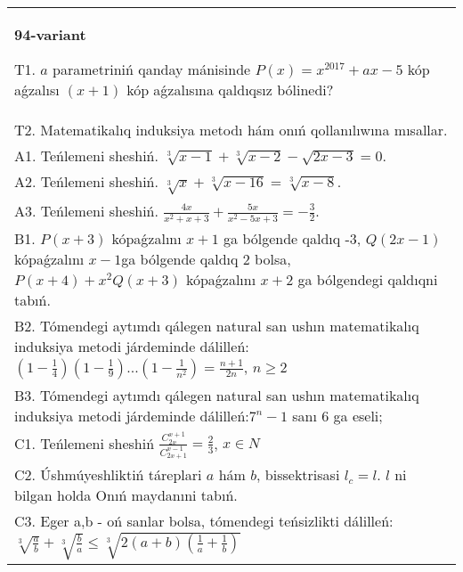 \documentclass{article}
\begin{document}
\begin{tabular}{m{17cm}}
\textbf{94-variant}
\newline

T1. \(a\) parametriniń qanday mánisinde \(P(x) = x^{2017} + ax - 5\) kóp aǵzalısı \((x + 1)\) kóp aǵzalısına qaldıqsız bólinedi? \\
T2. Matematikalıq induksiya metodı hám onıń qollanılıwına mısallar. \\
A1. Teńlemeni sheshiń. \(\sqrt[3]{x - 1} + \sqrt[3]{x - 2} - \sqrt{2x - 3} = 0\). \\
A2. Teńlemeni sheshiń. \(\sqrt[3]{x} + \sqrt[3]{x - 16} = \sqrt[3]{x - 8}\). \\
A3. Teńlemeni sheshiń. \(\frac{4x}{x^{2} + x + 3} + \frac{5x}{x^{2} - 5x + 3} = - \frac{3}{2}\). \\
B1. \(P(x + 3)\) kópaǵzalını \(x + 1\) ga bólgende qaldıq -3, \(Q(2x - 1)\) kópaǵzalını \(x - 1\)ga bólgende qaldıq 2 bolsa, \(P(x + 4) + x^{2}Q(x + 3)\) kópaǵzalını \(x + 2\) ga bólgendegi qaldıqni tabıń. \\
B2. Tómendegi aytımdı qálegen natural san ushın matematikalıq induksiya metodi járdeminde dálilleń: \(\left( 1 - \frac{1}{4} \right)\left( 1 - \frac{1}{9} \right)...\left( 1 - \frac{1}{n^{2}} \right) = \frac{n + 1}{2n}\), \(n \geq 2\) \\
B3. Tómendegi aytımdı qálegen natural san ushın matematikalıq induksiya metodi járdeminde dálilleń:\(7^{n} - 1\) sanı 6 ga eseli; \\
C1. Teńlemeni sheshiń \(\frac{C_{2x}^{x + 1}}{C_{2x + 1}^{x - 1}} = \frac{2}{3}\), \(x \in N\) \\
C2. Úshmúyeshliktiń táreplari \(a\) hám \(b\), bissektrisasi \(l_{c} = l\). \(l\) ni bilgan holda Onıń maydanıni tabıń. \\
C3. Eger a,b - oń sanlar bolsa, tómendegi teńsizlikti dálilleń: \(\sqrt[3]{\frac{a}{b}} + \sqrt[3]{\frac{b}{a}} \leq \sqrt[3]{2(a + b)\left( \frac{1}{a} + \frac{1}{b} \right)}\) \\

\end{tabular}
\vspace{1cm}
\end{document}
